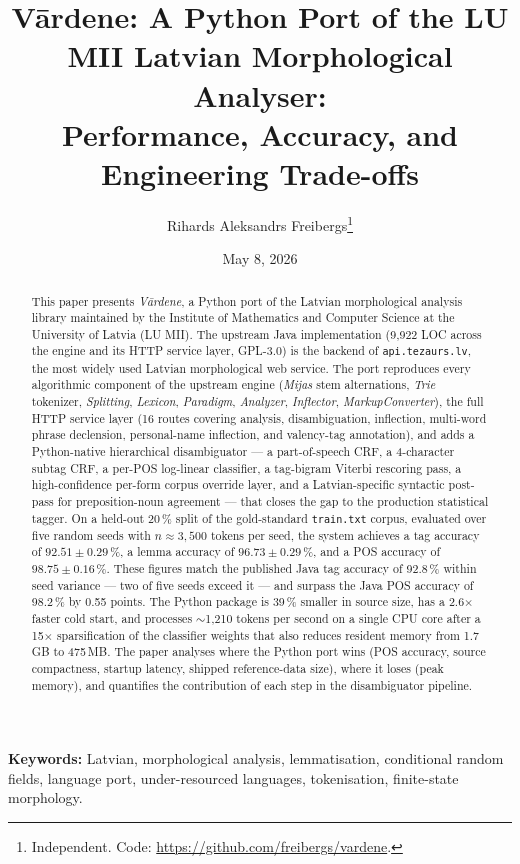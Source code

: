 \documentclass[11pt,a4paper]{article}
\title{Vārdene: A Python Port of the LU MII Latvian Morphological Analyser:\\
  \large Performance, Accuracy, and Engineering Trade-offs}
\author{Rihards Aleksandrs Freibergs\thanks{Independent. Code:
  \url{https://github.com/freibergs/vardene}.}}
\date{May 8, 2026}
\begin{document}
\maketitle

\begin{abstract}
This paper presents \emph{Vārdene}, a Python port of the Latvian
morphological analysis library maintained by the Institute of
Mathematics and Computer Science at the University of Latvia (LU MII).
The upstream Java implementation (9{,}922 LOC across the engine and
its HTTP service layer, GPL-3.0) is the backend of
\texttt{api.tezaurs.lv}, the most widely used Latvian morphological
web service. The port reproduces every algorithmic component of the
upstream engine (\textit{Mijas} stem alternations, \textit{Trie}
tokenizer, \textit{Splitting}, \textit{Lexicon}, \textit{Paradigm},
\textit{Analyzer}, \textit{Inflector}, \textit{MarkupConverter}), the
full HTTP service layer (16 routes covering analysis, disambiguation,
inflection, multi-word phrase declension, personal-name inflection,
and valency-tag annotation), and adds a Python-native hierarchical
disambiguator --- a part-of-speech CRF, a 4-character subtag CRF, a
per-POS log-linear classifier, a tag-bigram Viterbi rescoring pass, a
high-confidence per-form corpus override layer, and a Latvian-specific
syntactic post-pass for preposition-noun agreement --- that closes
the gap to the production statistical tagger. On a held-out 20\,\%
split of the gold-standard \texttt{train.txt} corpus, evaluated over
five random seeds with $n \approx 3{,}500$ tokens per seed, the system
achieves a tag accuracy of $\mathbf{92.51 \pm 0.29\,\%}$, a lemma
accuracy of $\mathbf{96.73 \pm 0.29\,\%}$, and a POS accuracy of
$\mathbf{98.75 \pm 0.16\,\%}$. These figures match the published Java
tag accuracy of 92.8\,\% within seed variance --- two of five seeds
exceed it --- and surpass the Java POS accuracy of 98.2\,\% by
0.55 points. The Python package is 39\,\% smaller in source size, has
a 2.6$\times$ faster cold start, and processes $\sim$1{,}210
tokens per second on a single CPU core after a 15$\times$
sparsification of the classifier weights that also reduces resident
memory from 1.7\,GB to 475\,MB. The paper analyses where the Python
port wins (POS accuracy, source compactness, startup latency, shipped
reference-data size), where it loses (peak memory), and quantifies
the contribution of each step in the disambiguator pipeline.
\end{abstract}

\noindent\textbf{Keywords:} Latvian, morphological analysis,
lemmatisation, conditional random fields, language port,
under-resourced languages, tokenisation, finite-state morphology.
\end{document}
